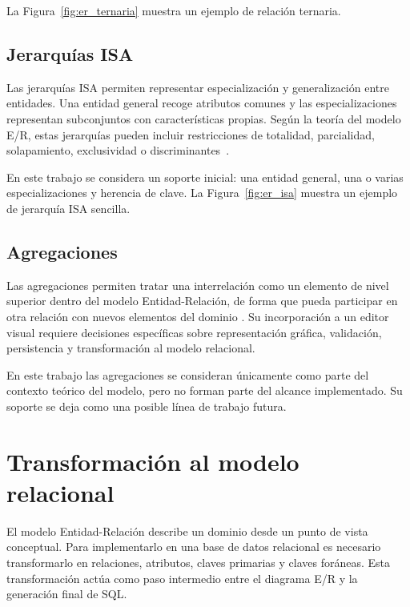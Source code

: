 La Figura~\ref{fig:er_ternaria} muestra un ejemplo de relación ternaria.


\subsection{Jerarquías ISA}

Las jerarquías ISA permiten representar especialización y generalización entre entidades. Una entidad general recoge atributos comunes y las especializaciones representan subconjuntos con características propias. Según la teoría del modelo E/R, estas jerarquías pueden incluir restricciones de totalidad, parcialidad, solapamiento, exclusividad o discriminantes~\cite{tema6}.

En este trabajo se considera un soporte inicial: una entidad general, una o varias especializaciones y herencia de clave. La Figura~\ref{fig:er_isa} muestra un ejemplo de jerarquía ISA sencilla.


\subsection{Agregaciones}

Las agregaciones permiten tratar una interrelación como un elemento de nivel superior dentro del modelo Entidad-Relación, de forma que pueda participar en otra relación con nuevos elementos del dominio \cite{tema6}. Su incorporación a un editor visual requiere decisiones específicas sobre representación gráfica, validación, persistencia y transformación al modelo relacional.

En este trabajo las agregaciones se consideran únicamente como parte del contexto teórico del modelo, pero no forman parte del alcance implementado. Su soporte se deja como una posible línea de trabajo futura.

\section{Transformación al modelo relacional}

El modelo Entidad-Relación describe un dominio desde un punto de vista conceptual. Para implementarlo en una base de datos relacional es necesario transformarlo en relaciones, atributos, claves primarias y claves foráneas. Esta transformación actúa como paso intermedio entre el diagrama E/R y la generación final de SQL.

